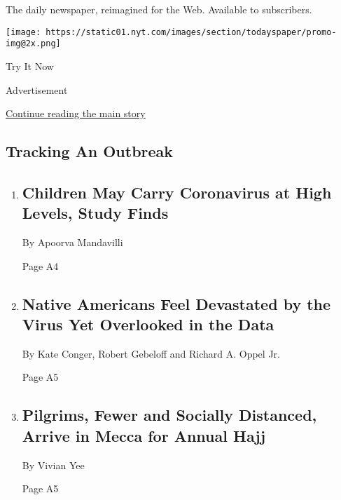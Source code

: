 The daily newspaper, reimagined for the Web. Available to subscribers.

\texttt{[image: https://static01.nyt.com/images/section/todayspaper/promo-img@2x.png]}

Try It Now

Advertisement

\protect\hyperlink{after-mid1}{Continue reading the main story}

\hypertarget{tracking-an-outbreak}{%
\subsection{Tracking An Outbreak}\label{tracking-an-outbreak}}

\begin{enumerate}
\def\labelenumi{\arabic{enumi}.}
\item
  \href{/2020/07/30/health/coronavirus-children.html}{}

  \hypertarget{children-may-carry-coronavirus-at-high-levels-study-finds}{%
  \subsection{Children May Carry Coronavirus at High Levels, Study
  Finds}\label{children-may-carry-coronavirus-at-high-levels-study-finds}}

  By Apoorva Mandavilli

  Page A4
\item
  \href{/2020/07/30/us/native-americans-coronavirus-data.html}{}

  \hypertarget{native-americans-feel-devastated-by-the-virus-yet-overlooked-in-the-data-1}{%
  \subsection{Native Americans Feel Devastated by the Virus Yet
  Overlooked in the
  Data}\label{native-americans-feel-devastated-by-the-virus-yet-overlooked-in-the-data-1}}

  By Kate Conger, Robert Gebeloff and Richard A. Oppel Jr.

  Page A5
\item
  \href{/2020/07/30/world/middleeast/pilgrims-hajj-mecca-coronavirus-pandemic.html}{}

  \hypertarget{pilgrims-fewer-and-socially-distanced-arrive-in-mecca-for-annual-hajj}{%
  \subsection{Pilgrims, Fewer and Socially Distanced, Arrive in Mecca
  for Annual
  Hajj}\label{pilgrims-fewer-and-socially-distanced-arrive-in-mecca-for-annual-hajj}}

  By Vivian Yee

  Page A5
\end{enumerate}

